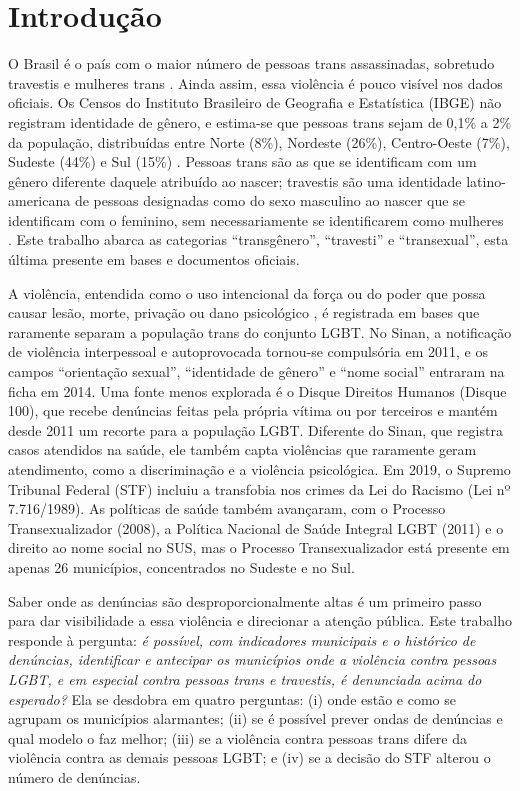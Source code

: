 \documentclass[12pt]{article}
\begin{document}
\section{Introdução}
\label{sec:introducao}

O Brasil é o país com o maior número de pessoas trans assassinadas, sobretudo travestis e mulheres trans \cite{marinho_tomazelli_firianelli:2024}. Ainda assim, essa violência é pouco visível nos dados oficiais. Os Censos do Instituto Brasileiro de Geografia e Estatística (IBGE) não registram identidade de gênero, e estima-se que pessoas trans sejam de 0,1\% a 2\% da população, distribuídas entre Norte (8\%), Nordeste (26\%), Centro-Oeste (7\%), Sudeste (44\%) e Sul (15\%) \cite{spizziri_eufrasio_lima:2021}. Pessoas trans são as que se identificam com um gênero diferente daquele atribuído ao nascer; travestis são uma identidade latino-americana de pessoas designadas como do sexo masculino ao nascer que se identificam com o feminino, sem necessariamente se identificarem como mulheres \cite{leal_silva_lizzi:2026}. Este trabalho abarca as categorias ``transgênero'', ``travesti'' e ``transexual'', esta última presente em bases e documentos oficiais.

A violência, entendida como o uso intencional da força ou do poder que possa causar lesão, morte, privação ou dano psicológico \cite{marinho_tomazelli_firianelli:2024}, é registrada em bases que raramente separam a população trans do conjunto LGBT. No Sinan, a notificação de violência interpessoal e autoprovocada tornou-se compulsória em 2011, e os campos ``orientação sexual'', ``identidade de gênero'' e ``nome social'' entraram na ficha em 2014. Uma fonte menos explorada é o Disque Direitos Humanos (Disque 100), que recebe denúncias feitas pela própria vítima ou por terceiros e mantém desde 2011 um recorte para a população LGBT. Diferente do Sinan, que registra casos atendidos na saúde, ele também capta violências que raramente geram atendimento, como a discriminação e a violência psicológica. Em 2019, o Supremo Tribunal Federal (STF) incluiu a transfobia nos crimes da Lei do Racismo (Lei nº 7.716/1989). As políticas de saúde também avançaram, com o Processo Transexualizador (2008), a Política Nacional de Saúde Integral LGBT (2011) e o direito ao nome social no SUS, mas o Processo Transexualizador está presente em apenas 26 municípios, concentrados no Sudeste e no Sul.

Saber onde as denúncias são desproporcionalmente altas é um primeiro passo para dar visibilidade a essa violência e direcionar a atenção pública. Este trabalho responde à pergunta: \textit{é possível, com indicadores municipais e o histórico de denúncias, identificar e antecipar os municípios onde a violência contra pessoas LGBT, e em especial contra pessoas trans e travestis, é denunciada acima do esperado?} Ela se desdobra em quatro perguntas: (i) onde estão e como se agrupam os municípios alarmantes; (ii) se é possível prever ondas de denúncias e qual modelo o faz melhor; (iii) se a violência contra pessoas trans difere da violência contra as demais pessoas LGBT; e (iv) se a decisão do STF alterou o número de denúncias.
\end{document}
